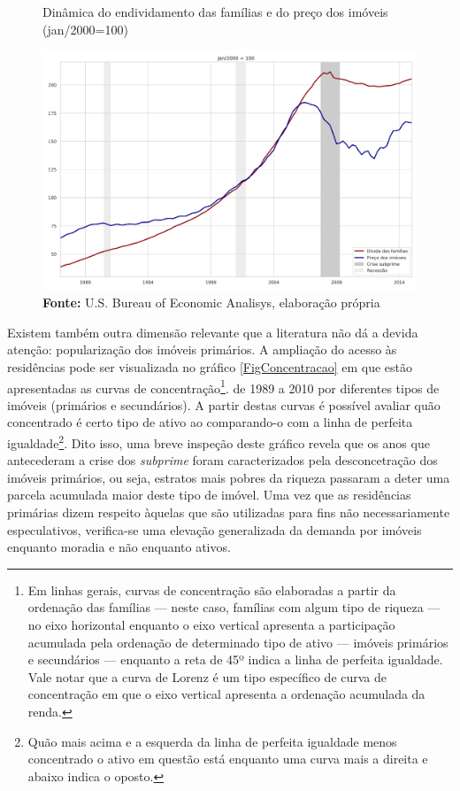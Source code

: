 \begin{figure}[H]
	\centering
	\caption{Dinâmica do endividamento das famílias e do preço dos imóveis (jan/2000=100)}
	\label{FigDividaPreco}
	\includegraphics[width=\textwidth]{../../Dados/Fatos_Estilizados/figs/Divida_PrecoImoveis.png}
	\caption*{\textbf{Fonte:} U.S. Bureau of Economic Analisys, elaboração própria}
\end{figure}

Existem também outra dimensão relevante que a literatura não dá a devida atenção: popularização dos imóveis primários.
A ampliação do acesso às residências pode ser visualizada no gráfico \ref{FigConcentracao} em que estão apresentadas as curvas de concentração\footnote{Em linhas gerais, curvas de concentração são elaboradas a partir da ordenação das famílias --- neste caso, famílias com algum tipo de riqueza --- no eixo horizontal enquanto o eixo vertical apresenta a participação acumulada  pela ordenação de determinado tipo de ativo --- imóveis primários e secundários --- enquanto a reta de 45º indica a linha de perfeita igualdade. Vale notar que a curva de Lorenz é um tipo específico de curva de concentração em que o eixo vertical apresenta a ordenação acumulada da renda.}. de 1989 a 2010 por diferentes tipos de imóveis (primários e secundários).
A partir destas curvas é possível avaliar quão concentrado é certo tipo de ativo ao comparando-o com a linha de perfeita igualdade\footnote{Quão mais acima e a esquerda da linha de perfeita igualdade menos concentrado o ativo em questão está enquanto uma curva mais a direita e abaixo indica o oposto.}.
Dito isso, uma breve inspeção deste gráfico revela que os anos que antecederam a crise dos \textit{subprime} foram caracterizados pela desconcetração dos imóveis primários, ou seja, estratos mais pobres da riqueza passaram a deter uma parcela acumulada maior deste tipo de imóvel.
Uma vez que as residências primárias dizem respeito àquelas que são utilizadas para fins não necessariamente especulativos, verifica-se uma elevação generalizada da demanda por imóveis enquanto moradia e não enquanto ativos.

